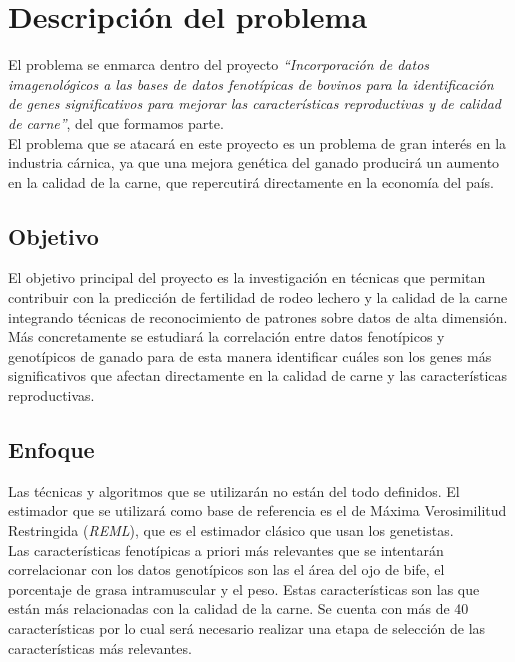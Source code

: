 \documentclass[12pt,a4paper,titlepage]{report}
\begin{document}
\chapter{Descripción del problema}

El problema se enmarca dentro del proyecto \emph{``Incorporación de datos imagenológicos a las bases de datos fenotípicas de bovinos para la identificación de genes significativos para mejorar las características reproductivas y de calidad de carne''}, del que formamos parte.\\

El problema que se atacará en este proyecto es un problema de gran interés en la industria cárnica, ya que una mejora genética del ganado producirá un aumento en la calidad de la carne, que repercutirá directamente en la economía del país.

\section*{Objetivo}

El objetivo principal del proyecto es la investigación en técnicas que permitan
contribuir con la predicción de fertilidad de rodeo lechero y la calidad de la carne
integrando técnicas de reconocimiento de patrones sobre datos de alta dimensión.\\

Más concretamente se estudiará la correlación entre datos fenotípicos y genotípicos de ganado para de esta manera identificar cuáles son los genes más significativos que afectan directamente en la calidad de carne y las características reproductivas.

\section*{Enfoque}

Las técnicas y algoritmos que se utilizarán no están del todo definidos. El estimador que se utilizará como base de referencia es el de Máxima Verosimilitud Restringida (\emph{REML}), que es el estimador clásico que usan los genetistas.\\

Las características fenotípicas a priori más relevantes que se intentarán correlacionar con los datos genotípicos son las el área del ojo de bife, el porcentaje de grasa intramuscular y el peso. Estas características son las que están más relacionadas con la calidad de la carne. Se cuenta con más de 40 características por lo cual será necesario realizar una etapa de selección de las características más relevantes.
\end{document}
